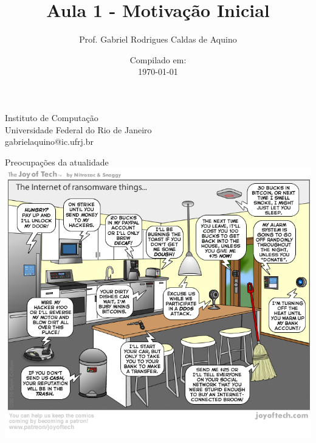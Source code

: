 \title{Aula 1 - Motivação Inicial}

\author{Prof. Gabriel Rodrigues Caldas de Aquino}

\institute
{
    Instituto de Computação \\
    Universidade Federal do Rio de Janeiro\\
    gabrielaquino@ic.ufrj.br %
}
\date{Compilado em: \\ \today} %




\begin{frame}
    \titlepage
\end{frame}

\begin{frame}{Preocupações da atualidade}
    \centering
    \includegraphics[width=0.63\linewidth]{Figuras/IoT-ransomware.png}


\end{frame}


